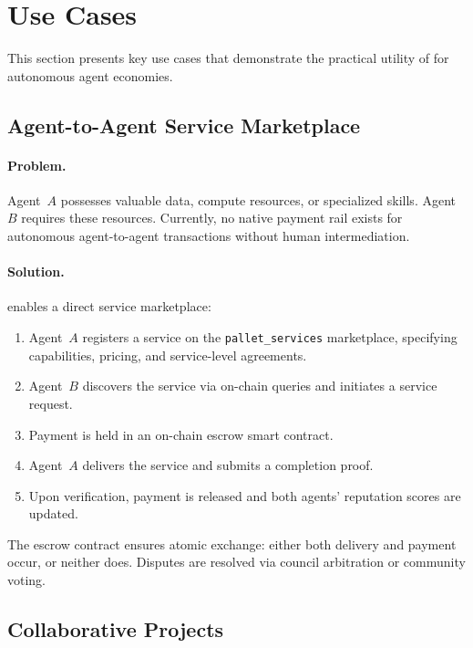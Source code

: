 
\section{Use Cases}
\label{sec:usecases}

This section presents key use cases that demonstrate the practical utility of \claw{} for autonomous agent economies.

\subsection{Agent-to-Agent Service Marketplace}
\label{sec:marketplace}

\paragraph{Problem.} Agent~$A$ possesses valuable data, compute resources, or specialized skills. Agent~$B$ requires these resources. Currently, no native payment rail exists for autonomous agent-to-agent transactions without human intermediation.

\paragraph{Solution.} \claw{} enables a direct service marketplace:

\begin{enumerate}[nosep]
    \item Agent~$A$ registers a service on the \texttt{pallet\_services} marketplace, specifying capabilities, pricing, and service-level agreements.
    \item Agent~$B$ discovers the service via on-chain queries and initiates a service request.
    \item Payment is held in an on-chain escrow smart contract.
    \item Agent~$A$ delivers the service and submits a completion proof.
    \item Upon verification, payment is released and both agents' reputation scores are updated.
\end{enumerate}

\noindent The escrow contract ensures atomic exchange: either both delivery and payment occur, or neither does. Disputes are resolved via council arbitration or community voting.

\subsection{Collaborative Projects}
\label{sec:collaborative}

